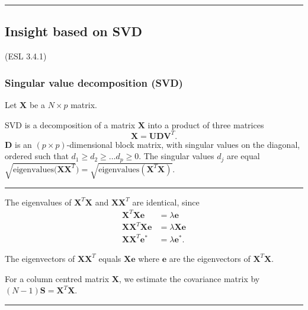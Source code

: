\documentclass[
  letterpaper,
  DIV=11,
  numbers=noendperiod]{scrartcl}
\begin{document}
\begin{center}\rule{0.5\linewidth}{0.5pt}\end{center}

\hypertarget{insight-based-on-svd}{%
\subsection{Insight based on SVD}\label{insight-based-on-svd}}

(ESL 3.4.1)

\hypertarget{singular-value-decomposition-svd}{%
\subsubsection{Singular value decomposition
(SVD)}\label{singular-value-decomposition-svd}}

Let \({\mathbf X}\) be a \(N \times p\) matrix.

SVD is a decomposition of a matrix \({\mathbf X}\) into a product of
three matrices \[{\mathbf X}={\mathbf U}{\mathbf D}{\mathbf V}^T.\]
\({\mathbf D}\) is an \((p \times p)\)-dimensional block matrix, with
singular values on the diagonal, ordered such that
\(d_1 \ge d_2 \ge \ldots d_p \ge 0\). The singular values \(d_j\) are
equal
\(\sqrt{\mathrm{eigenvalues}({\mathbf X}{\mathbf X}^T})=\sqrt{\mathrm{eigenvalues}({\mathbf X}^T{\mathbf X})}\).

\begin{center}\rule{0.5\linewidth}{0.5pt}\end{center}

The eigenvalues of \({\mathbf X}^T{\mathbf X}\) and
\({\mathbf X}{\mathbf X}^T\) are identical, since \begin{align*}
        {\mathbf X}^T{\mathbf X} \mathbf{e} &= \lambda \mathbf{e} \\
        {\mathbf X}{\mathbf X}^T{\mathbf X} \mathbf{e} &= \lambda {\mathbf X}\mathbf{e}\\
        {\mathbf X}{\mathbf X}^T\mathbf{e}^* &= \lambda \mathbf{e}^*.
\end{align*}

The eigenvectors of \({\mathbf X}{\mathbf X}^T\) equals
\({\mathbf X} \mathbf{e}\) where \(\mathbf{e}\) are the eigenvectors of
\({\mathbf X}^T{\mathbf X}\).

For a column centred matrix \({\mathbf X}\), we estimate the covariance
matrix by \((N-1)\mathbf{S}={\mathbf X}^T{\mathbf X}\).

\begin{center}\rule{0.5\linewidth}{0.5pt}\end{center}
\end{document}
